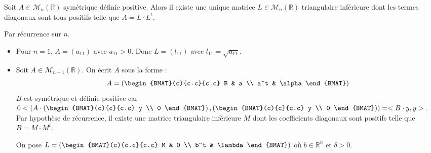 \documentclass{beamer}
\begin{document}
\begin{frame}
\begin{theorem}
Soit $A \in \mathscr{M}_n(\mathbb{R})$ symétrique définie positive. Alors il existe une unique matrice $L \in \mathscr{M}_n(\mathbb{R})$ triangulaire inférieure dont les termes diagonaux sont tous positifs telle que $A= L \cdot L^t$. 
\end{theorem}

Par récurrence sur $n$.
\begin{itemize}
\item Pour $n=1$, $A=(a_{11})$ avec $a_{11} >0$. Donc $L=(l_{11})$ avec $l_{11}=\sqrt{a_{11}}$.
\item Soit $A \in \mathscr{M}_{n+1}(\mathbb{R})$. On écrit $A$ sous la forme :
\[
A= \left( \begin{BMAT}(c){c.c}{c.c}
B & a \\
a^t & \alpha 
\end{BMAT} \right)
\]
$B$ est symétrique et définie positive car $0 <
 \left( A  \cdot  \left( \begin{BMAT}(c){c}{c.c}
y \\
0
\end{BMAT} \right),\left( \begin{BMAT}(c){c}{c.c}
y \\
0
\end{BMAT} \right) \right) = < B \cdot y, y >$.
Par hypothèse de récurrence, il existe une matrice triangulaire inférieure $M$ dont les coefficients diagonaux sont positifs telle que $B=M \cdot M^t$.

On pose $L= \left( \begin{BMAT}(c){c.c}{c.c}
M & 0 \\
b^t & \lambda 
\end{BMAT} \right)$ où $b \in \mathbb{R}^n$ et $\delta>0$.

\end{itemize}

\end{frame}
\end{document}

